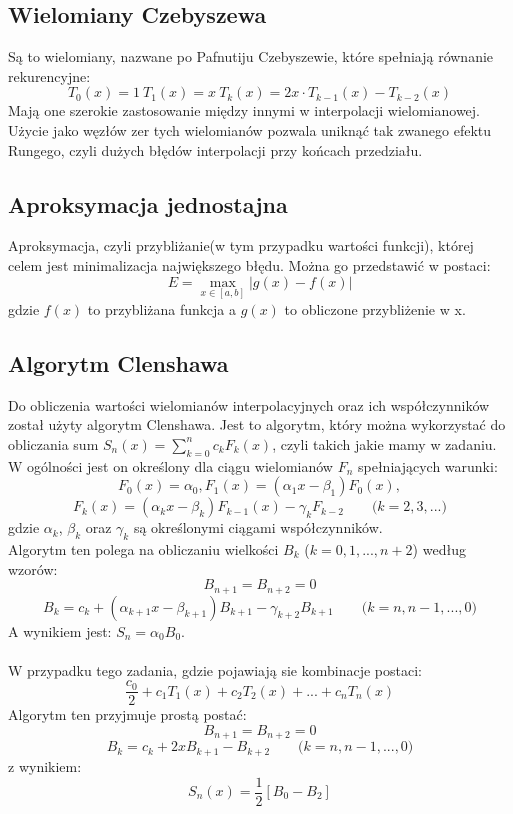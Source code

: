 \documentclass[11pt,leqno]{article}
\begin{document}
\subsection{Wielomiany Czebyszewa}\label{SS:Czebyszew}
Są to wielomiany, nazwane po Pafnutiju Czebyszewie, które spełniają równanie rekurencyjne:
\begin{equation}\label{E:Czebyszew}
    T_0(x)=1\ T_1(x)=x\ T_k(x)=2x\cdot T_{k-1}(x) - T_{k-2}(x)
\end{equation}
Mają one szerokie zastosowanie między innymi w interpolacji wielomianowej. Użycie jako węzłów zer tych wielomianów pozwala uniknąć tak zwanego efektu Rungego, czyli dużych błędów interpolacji przy końcach przedziału.

\subsection{Aproksymacja jednostajna}\label{SS:Aproksymacja}
Aproksymacja, czyli przybliżanie(w tym przypadku wartości funkcji), której celem jest minimalizacja największego błędu. Można go przedstawić w postaci:
$$
    E = \max_{x\in[a,b]}|g(x)-f(x)|
$$
gdzie $f(x)$ to przybliżana funkcja a $g(x)$ to obliczone przybliżenie w x.

\subsection{Algorytm Clenshawa}\label{SS:Clenshaw}
Do obliczenia wartości wielomianów interpolacyjnych oraz ich współczynników został użyty algorytm Clenshawa. Jest to algorytm, który można wykorzystać do obliczania sum $S_n(x) = \sum_{k=0}^{n}c_kF_k(x)$, czyli takich jakie mamy w zadaniu.\\
W ogólności jest on określony dla ciągu wielomianów $F_n$ spełniających warunki:
$$ F_0(x) = \alpha_0, F_1(x) = (\alpha_1 x - \beta_1)F_0(x), $$
$$ F_k(x) = (\alpha_k x - \beta_k)F_{k-1}(x) - \gamma_k F_{k-2} \qquad\mbox{($k = 2, 3, ...$)} $$
gdzie $\alpha_k$, $\beta_k$ oraz $\gamma_k$ są określonymi ciągami współczynników. \\
Algorytm ten polega na obliczaniu wielkości $B_k$ ($k=0,1,...,n+2$) według wzorów:
$$ B_{n+1} = B_{n+2} = 0 $$
$$ B_k = c_k + (\alpha_{k+1} x - \beta_{k+1})B_{k+1} - \gamma_{k+2}B_{k+1} \qquad\mbox{($k=n,n-1,...,0$)} $$
A wynikiem jest: $S_n = \alpha_0B_0$.\\ \\
W przypadku tego zadania, gdzie pojawiają sie kombinacje postaci:
$$
    \frac{c_0}{2} + c_1T_1(x) + c_2T_2(x) + ... + c_nT_n(x)
$$
Algorytm ten przyjmuje prostą postać:
$$ B_{n+1} = B_{n+2} = 0 $$
$$ B_k = c_k + 2xB_{k+1} - B_{k+2} \qquad\mbox{($k=n,n-1,...,0$)} $$
z wynikiem:
$$ S_n(x) = \frac{1}{2}[B_0 - B_2] $$
\end{document}
